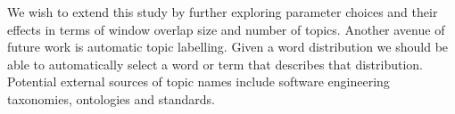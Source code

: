 \documentclass[times, 10pt,twocolumn]{article}
\newcommand{\shrinkit}{\vspace*{-.3em}}
\begin{document}
\shrinkit
{}
\shrinkit
\shrinkit

We wish to extend this study by further exploring parameter
  choices and their effects in terms of window overlap size and number
 of topics.
Another avenue of future work is automatic topic labelling. Given a word
distribution we should be able to automatically select a word or term
that describes that distribution. Potential external sources of topic
names include software engineering taxonomies, ontologies and
standards.


\shrinkit


\shrinkit


%


\end{document}
